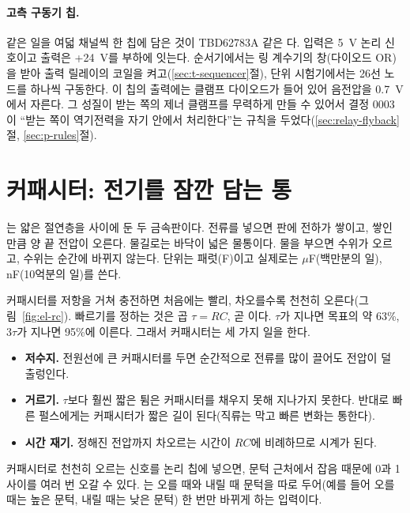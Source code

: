 \paragraph{고측 구동기 칩.} 같은 일을 여덟 채널씩 한 칩에 담은 것이 TBD62783A 같은 다.
입력은 5~V 논리 신호이고 출력은 +24~V를 부하에 잇는다. 순서기에서는 링 계수기의 창(다이오드 OR)을 받아 출력
릴레이의 코일을 켜고(\ref{sec:t-sequencer}절), 단위 시험기에서는 26선 노드를 하나씩 구동한다. 이 칩의 출력에는 클램프
다이오드가 들어 있어 음전압을 0.7~V에서 자른다. 그 성질이 받는 쪽의 제너 클램프를 무력하게 만들 수 있어서 결정
0003이 ``받는 쪽이 역기전력을 자기 안에서 처리한다''는 규칙을 두었다(\ref{sec:relay-flyback}절, \ref{sec:p-rules}절).

\section{커패시터: 전기를 잠깐 담는 통}\label{sec:el-cap}

\Why {}는 얇은 절연층을 사이에 둔 두 금속판이다. 전류를 넣으면 판에 전하가 쌓이고, 쌓인
만큼 양 끝 전압이 오른다. 물길로는 바닥이 넓은 물통이다. 물을 부으면 수위가 오르고, 수위는 순간에 바뀌지 않는다.
단위는 패럿(F)이고 실제로는 $\mu$F(백만분의 일), nF(10억분의 일)를 쓴다.

커패시터를 저항을 거쳐 충전하면 처음에는 빨리, 차오를수록 천천히 오른다(그림~\ref{fig:el-rc}). 빠르기를 정하는 것은
곱 $\tau = RC$, 곧 이다. $\tau$가 지나면 목표의 약 63\%, $3\tau$가 지나면 95\%에 이른다.
그래서 커패시터는 세 가지 일을 한다.
\begin{itemize}
\item \textbf{저수지.} 전원선에 큰 커패시터를 두면 순간적으로 전류를 많이 끌어도 전압이 덜 출렁인다.
\item \textbf{거르기.} $\tau$보다 훨씬 짧은 튐은 커패시터를 채우지 못해 지나가지 못한다. 반대로 빠른 펄스에게는 커패시터가
짧은 길이 된다(직류는 막고 빠른 변화는 통한다).
\item \textbf{시간 재기.} 정해진 전압까지 차오르는 시간이 $RC$에 비례하므로 시계가 된다.
\end{itemize}
커패시터로 천천히 오르는 신호를 논리 칩에 넣으면, 문턱 근처에서 잡음 때문에 0과 1 사이를 여러 번 오갈 수 있다.
는 오를 때와 내릴 때 문턱을 따로 두어(예를 들어 오를 때는 높은 문턱, 내릴 때는 낮은
문턱) 한 번만 바뀌게 하는 입력이다.

